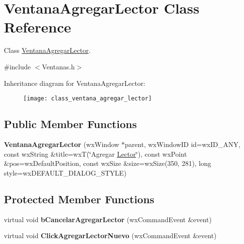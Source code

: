 \hypertarget{class_ventana_agregar_lector}{}\section{Ventana\+Agregar\+Lector Class Reference}
\label{class_ventana_agregar_lector}


Class \hyperlink{class_ventana_agregar_lector}{Ventana\+Agregar\+Lector}.  




{\ttfamily \#include $<$Ventanas.\+h$>$}

Inheritance diagram for Ventana\+Agregar\+Lector\+:\begin{figure}[H]
\begin{center}
\leavevmode
\texttt{[image: class\_ventana\_agregar\_lector]}
\end{center}
\end{figure}
\subsection*{Public Member Functions}
\begin{DoxyCompactItemize}
\item 
{\bfseries Ventana\+Agregar\+Lector} (wx\+Window $\ast$parent, wx\+Window\+ID id=wx\+I\+D\+\_\+\+A\+NY, const wx\+String \&title=wxT(\char`\"{}Agregar \hyperlink{class_lector}{Lector}\char`\"{}), const wx\+Point \&pos=wx\+Default\+Position, const wx\+Size \&size=wx\+Size(350, 281), long style=wx\+D\+E\+F\+A\+U\+L\+T\+\_\+\+D\+I\+A\+L\+O\+G\+\_\+\+S\+T\+Y\+LE)\hypertarget{class_ventana_agregar_lector_a22bf15c810d43d286a336c1e3324f75d}{}\label{class_ventana_agregar_lector_a22bf15c810d43d286a336c1e3324f75d}

\end{DoxyCompactItemize}
\subsection*{Protected Member Functions}
\begin{DoxyCompactItemize}
\item 
virtual void {\bfseries b\+Cancelar\+Agregar\+Lector} (wx\+Command\+Event \&event)\hypertarget{class_ventana_agregar_lector_a2e95e648484392e1bf99b03b3ec46e41}{}\label{class_ventana_agregar_lector_a2e95e648484392e1bf99b03b3ec46e41}

\item 
virtual void {\bfseries Click\+Agregar\+Lector\+Nuevo} (wx\+Command\+Event \&event)\hypertarget{class_ventana_agregar_lector_ac1ceb71d63048cbd1b5d856b6b65ae2e}{}\label{class_ventana_agregar_lector_ac1ceb71d63048cbd1b5d856b6b65ae2e}

\end{DoxyCompactItemize}
